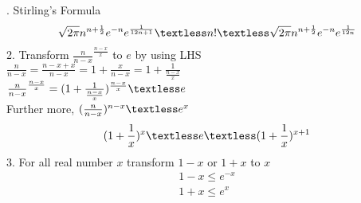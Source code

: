 . Stirling's Formula
\begin{align}
    \nonumber \sqrt{2\pi}n^{n+\frac{1}{2}}e^{-n}e^{\frac{1}{12n+1}}\textless n! \textless \sqrt{2\pi}n^{n+\frac{1}{2}}e^{-n}e^{\frac{1}{12n}} 
\end{align}
2. Transform $\frac{n}{n-x}^{\frac{n-x}{x}}$ to $e$ by using LHS\\
$\frac{n}{n-x}=\frac{n-x+x}{n-x}=1+\frac{x}{n-x}=1+\frac{1}{\frac{n-x}{x}}$\\
$\frac{n}{n-x}^{\frac{n-x}{x}}=(1+\frac{1}{\frac{n-x}{x}})^{\frac{n-x}{x}} \textless e$\\
Further more, $(\frac{n}{n-x})^{n-x} \textless e^{x}$
\begin{align}
    \nonumber (1+\frac{1}{x})^{x} \textless e \textless (1+\frac{1}{x})^{x+1}
\end{align}
3. For all real number $x$ transform $1-x$ or $1+x$ to $x$
\begin{align}
    \nonumber 1-x \le e^{-x}\\
    \nonumber 1+x \le e^{x}
\end{align}
